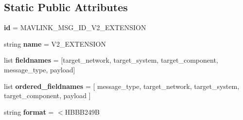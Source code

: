 \subsection*{Static Public Attributes}
\begin{DoxyCompactItemize}
\item 
\mbox{\label{classpymavlink_1_1dialects_1_1v10_1_1MAVLink__v2__extension__message_a8d2723056e052ab8a3e1c5e90c57f0f0}} 
{\bfseries id} = M\+A\+V\+L\+I\+N\+K\+\_\+\+M\+S\+G\+\_\+\+I\+D\+\_\+\+V2\+\_\+\+E\+X\+T\+E\+N\+S\+I\+ON
\item 
\mbox{\label{classpymavlink_1_1dialects_1_1v10_1_1MAVLink__v2__extension__message_a40a2125c559f7988fdfa6aa41c98fb9e}} 
string {\bfseries name} = \textquotesingle{}V2\+\_\+\+E\+X\+T\+E\+N\+S\+I\+ON\textquotesingle{}
\item 
\mbox{\label{classpymavlink_1_1dialects_1_1v10_1_1MAVLink__v2__extension__message_a3dd210e1f27d85f11fbf636337105f13}} 
list {\bfseries fieldnames} = \mbox{[}\textquotesingle{}target\+\_\+network\textquotesingle{}, \textquotesingle{}target\+\_\+system\textquotesingle{}, \textquotesingle{}target\+\_\+component\textquotesingle{}, \textquotesingle{}message\+\_\+type\textquotesingle{}, \textquotesingle{}payload\textquotesingle{}\mbox{]}
\item 
\mbox{\label{classpymavlink_1_1dialects_1_1v10_1_1MAVLink__v2__extension__message_afb7bbf20c119ef800b14dc43c4fbf20e}} 
list {\bfseries ordered\+\_\+fieldnames} = \mbox{[} \textquotesingle{}message\+\_\+type\textquotesingle{}, \textquotesingle{}target\+\_\+network\textquotesingle{}, \textquotesingle{}target\+\_\+system\textquotesingle{}, \textquotesingle{}target\+\_\+component\textquotesingle{}, \textquotesingle{}payload\textquotesingle{} \mbox{]}
\item 
\mbox{\label{classpymavlink_1_1dialects_1_1v10_1_1MAVLink__v2__extension__message_a19ae5d4bfbca76ad0e06257156cf2c5b}} 
string {\bfseries format} = \textquotesingle{}$<$H\+B\+B\+B249B\textquotesingle{}

\end{DoxyCompactItemize}
